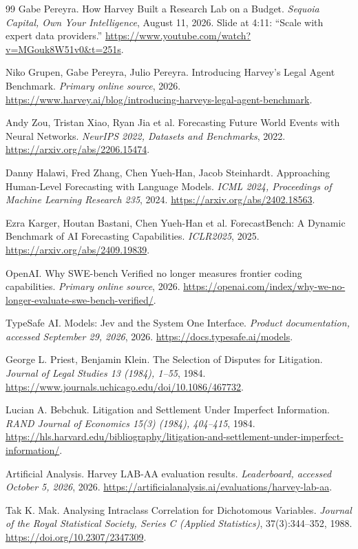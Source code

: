 \documentclass[11pt]{article}
\begin{document}
\begin{thebibliography}{99}
 Gabe Pereyra. How Harvey Built a Research Lab on a Budget. \emph{Sequoia Capital, Own Your Intelligence}, August 11, 2026. Slide at 4:11: ``Scale with expert data providers.'' \url{https://www.youtube.com/watch?v=MGouk8W51v0\&t=251s}.

 Niko Grupen, Gabe Pereyra, Julio Pereyra. Introducing Harvey's Legal Agent Benchmark. \emph{Primary online source}, 2026. \url{https://www.harvey.ai/blog/introducing-harveys-legal-agent-benchmark}.

 Andy Zou, Tristan Xiao, Ryan Jia et al. Forecasting Future World Events with Neural Networks. \emph{NeurIPS 2022, Datasets and Benchmarks}, 2022. \url{https://arxiv.org/abs/2206.15474}.

 Danny Halawi, Fred Zhang, Chen Yueh-Han, Jacob Steinhardt. Approaching Human-Level Forecasting with Language Models. \emph{ICML 2024, Proceedings of Machine Learning Research 235}, 2024. \url{https://arxiv.org/abs/2402.18563}.

 Ezra Karger, Houtan Bastani, Chen Yueh-Han et al. ForecastBench: A Dynamic Benchmark of AI Forecasting Capabilities. \emph{ICLR2025}, 2025. \url{https://arxiv.org/abs/2409.19839}.

 OpenAI. Why SWE-bench Verified no longer measures frontier coding capabilities. \emph{Primary online source}, 2026. \url{https://openai.com/index/why-we-no-longer-evaluate-swe-bench-verified/}.

 TypeSafe AI. Models: Jev and the System One Interface. \emph{Product documentation, accessed September 29, 2026}, 2026. \url{https://docs.typesafe.ai/models}.

 George L. Priest, Benjamin Klein. The Selection of Disputes for Litigation. \emph{Journal of Legal Studies 13 (1984), 1--55}, 1984. \url{https://www.journals.uchicago.edu/doi/10.1086/467732}.

 Lucian A. Bebchuk. Litigation and Settlement Under Imperfect Information. \emph{RAND Journal of Economics 15(3) (1984), 404--415}, 1984. \url{https://hls.harvard.edu/bibliography/litigation-and-settlement-under-imperfect-information/}.

 Artificial Analysis. Harvey LAB-AA evaluation results. \emph{Leaderboard, accessed October 5, 2026}, 2026. \url{https://artificialanalysis.ai/evaluations/harvey-lab-aa}.

 Tak K. Mak. Analysing Intraclass Correlation for Dichotomous Variables. \emph{Journal of the Royal Statistical Society, Series C (Applied Statistics)}, 37(3):344--352, 1988. \url{https://doi.org/10.2307/2347309}.

\end{thebibliography}
\end{document}

